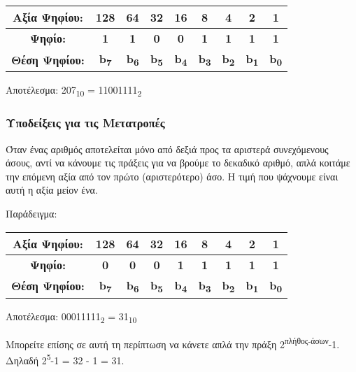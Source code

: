 \begin{center}
\begin{tabular}{|c|c|c|c|c|c|c|c|c|}
\hline
Αξία Ψηφίου: & 128 & 64 & 32 & 16 & 8 & 4 & 2 & 1 \\
\hline
\textbf{Ψηφίο:} & \textbf{1} & \textbf{1} & \textbf{0} & \textbf{0} & \textbf{1} & \textbf{1} & \textbf{1} & \textbf{1} \\
\hline
\textbf{Θέση Ψηφίου:} & \textbf{b\textsubscript{7}}& \textbf{b\textsubscript{6}} & \textbf{b\textsubscript{5}} & \textbf{b\textsubscript{4}} & \textbf{b\textsubscript{3}}& \textbf{b\textsubscript{2}} & \textbf{b\textsubscript{1}} & \textbf{b\textsubscript{0}}  \\
\hline
\end{tabular}

Αποτέλεσμα: 207\textsubscript{10} = 11001111\textsubscript{2}
\end{center}

\subsubsection*{Υποδείξεις για τις Μετατροπές}

Όταν ένας αριθμός αποτελείται μόνο από δεξιά προς τα αριστερά συνεχόμενους άσους, αντί να κάνουμε τις πράξεις για να βρούμε το δεκαδικό αριθμό, απλά κοιτάμε την επόμενη αξία από τον πρώτο (αριστερότερο) άσο. Η τιμή που ψάχνουμε είναι αυτή η αξία μείον ένα.

Παράδειγμα:

\begin{center}
\begin{tabular}{|c|c|c|c|c|c|c|c|c|}
\hline
Αξία Ψηφίου: & 128 & 64 & 32 & 16 & 8 & 4 & 2 & 1 \\
\hline
\textbf{Ψηφίο:} & \textbf{0} & \textbf{0} & \textbf{0} & \textbf{1} & \textbf{1} & \textbf{1} & \textbf{1} & \textbf{1} \\
\hline
\textbf{Θέση Ψηφίου:} & \textbf{b\textsubscript{7}}& \textbf{b\textsubscript{6}} & \textbf{b\textsubscript{5}} & \textbf{b\textsubscript{4}} & \textbf{b\textsubscript{3}}& \textbf{b\textsubscript{2}} & \textbf{b\textsubscript{1}} & \textbf{b\textsubscript{0}}  \\
\hline
\end{tabular}

Αποτέλεσμα: 00011111\textsubscript{2} = 31\textsubscript{10} 
\end{center}

Μπορείτε επίσης σε αυτή τη περίπτωση να κάνετε απλά την πράξη 2\textsuperscript{πλήθος-άσων}-1. Δηλαδή 2\textsuperscript{5}-1 = 32 - 1 = 31.

